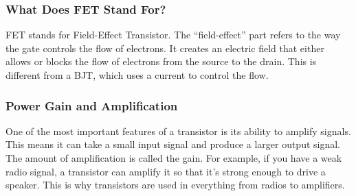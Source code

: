 
\subsubsection*{What Does FET Stand For?}
FET stands for Field-Effect Transistor. The “field-effect” part refers to the way the gate controls the flow of electrons. It creates an electric field that either allows or blocks the flow of electrons from the source to the drain. This is different from a BJT, which uses a current to control the flow.

\subsubsection*{Power Gain and Amplification}
One of the most important features of a transistor is its ability to amplify signals. This means it can take a small input signal and produce a larger output signal. The amount of amplification is called the gain. For example, if you have a weak radio signal, a transistor can amplify it so that it’s strong enough to drive a speaker. This is why transistors are used in everything from radios to amplifiers.

